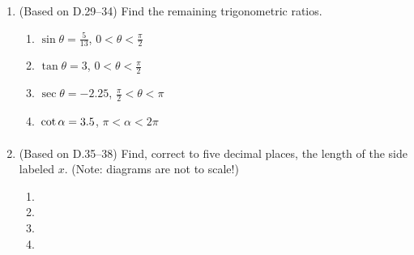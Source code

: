 \documentclass[11pt]{article}
\newcommand{\ds}{\displaystyle}
\begin{document}
\begin{enumerate}
\begin{multicols}{4}
\begin{enumerate}
  \item $\ds \frac{2\pi}{3}$
  \item $\ds \frac{9\pi}{4}$
  \item $\ds -\frac{5\pi}{6}$
  \item $\ds -\frac{11\pi}{2}$
  \end{enumerate}
  \end{multicols}
\item (Based on D.29--34) Find the remaining trigonometric ratios.
  \begin{multicols}{2}
  \begin{enumerate}
  \item $\ds \sin\theta = \frac{5}{13}$, $0<\theta<\frac{\pi}{2}$
  \item $\ds \tan\theta = 3$, $0<\theta<\frac{\pi}{2}$
  \item $\ds \sec\theta = -2.25$, $\frac{\pi}{2}<\theta<\pi$
  \item $\ds \vphantom{\frac{\pi}{2}} \cot\alpha = 3.5$, $\pi<\alpha<2\pi$
  \end{enumerate}
  \end{multicols}
\item (Based on D.35--38) Find, correct to five decimal places, the 
  length of the side labeled $x$.  (Note: diagrams are not to scale!)
  \begin{multicols}{4}
  \begin{enumerate}
  \item %
  \item %
  \item %
  \item %

\end{enumerate}
\end{multicols}
\end{enumerate}
\end{document}
